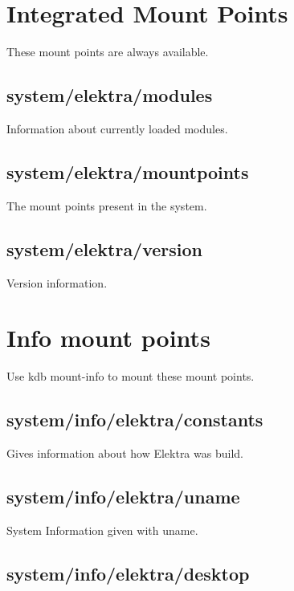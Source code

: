 \hypertarget{md_doc_help_elektra-hierarchy_doc_help_elektra-hierarchy_md}{}\section{Integrated Mount Points}\label{md_doc_help_elektra-hierarchy_doc_help_elektra-hierarchy_md}
These mount points are always available.

\subsection*{system/elektra/modules}

Information about currently loaded modules.

\subsection*{system/elektra/mountpoints}

The mount points present in the system.

\subsection*{system/elektra/version}

Version information.

\section*{Info mount points}

Use {\ttfamily kdb mount-\/info} to mount these mount points.

\subsection*{system/info/elektra/constants}

Gives information about how Elektra was build.

\subsection*{system/info/elektra/uname}

System Information given with {\ttfamily uname}.

\subsection*{system/info/elektra/desktop}

